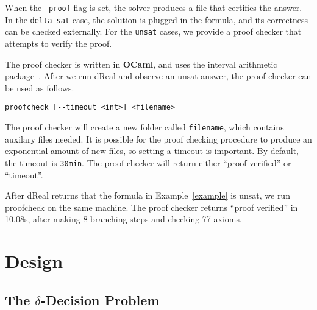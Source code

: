 \documentclass[envcountsect]{llncs}
\begin{document}
When the {\tt --proof} flag is set, the solver produces a file that certifies
the answer. In the {\tt delta-sat} case, the solution is plugged in the
formula, and its correctness can be checked externally. For the {\tt unsat}
cases, we provide a proof checker that attempts to verify the proof.

The proof checker is written in {\bf OCaml}, and uses the interval arithmetic
package~\cite{}. After we run {\sf dReal} and observe an {\sf unsat} answer,
the proof checker can be used as follows.
\begin{verbatim}
proofcheck [--timeout <int>] <filename>
\end{verbatim}
The proof checker will create a new folder called {\tt filename}, which
contains auxilary files needed. It is possible for the proof
checking procedure to produce an exponential amount of new files, so setting a
 timeout is important. By default, the timeout is {\tt 30min}. The proof
checker will return either ``{\sf proof verified}'' or ``{\sf timeout}''.

\begin{example}
After {\sf dReal} returns that the formula in Example~\ref{example} is {\sf
unsat}, we run {\sf proofcheck} on the same machine. The proof checker returns
``{\sf proof verified}'' in 10.08s, after making 8 branching steps and
checking 77 axioms.
\end{example}

\section{Design}

\subsection{The $\delta$-Decision Problem}\label{deltas}
\end{document}
